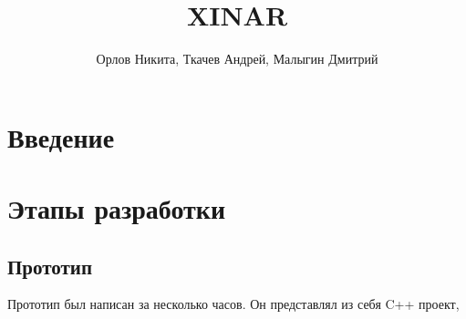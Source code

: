 \documentclass[a4paper,12pt]{article}
\begin{document}
	\title{XINAR}
	\author{Орлов Никита, Ткачев Андрей, Малыгин Дмитрий}
	\maketitle
	
	
	\section{Введение}
	
	\section{Этапы разработки}
	\subsection{Прототип}
	
	Прототип был написан за несколько часов. Он представлял из себя C++ проект, 
	
	
\end{document}
